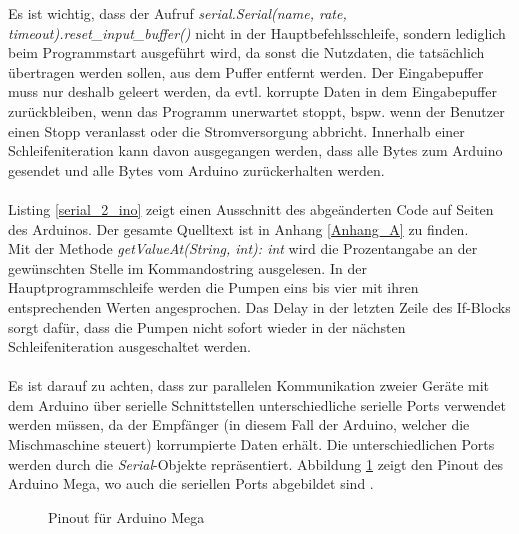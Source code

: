 Es ist wichtig, dass der Aufruf \textit{serial.Serial(name, rate, timeout).reset\_input\_buffer()} nicht in der Hauptbefehlsschleife, sondern lediglich beim Programmstart ausgeführt wird, da sonst die Nutzdaten, die tatsächlich übertragen werden sollen, aus dem Puffer entfernt werden. Der Eingabepuffer muss nur deshalb geleert werden, da evtl. korrupte Daten in dem Eingabepuffer zurückbleiben, wenn das Programm unerwartet stoppt, bspw. wenn der Benutzer einen Stopp veranlasst oder die Stromversorgung abbricht. Innerhalb einer Schleifeniteration kann davon ausgegangen werden, dass alle Bytes zum Arduino gesendet und alle Bytes vom Arduino zurückerhalten werden.\\\\
Listing \ref{serial_2_ino} zeigt einen Ausschnitt des abgeänderten Code auf Seiten des Arduinos. Der gesamte Quelltext ist in Anhang \ref{Anhang_A} zu finden.\\

Mit der Methode \textit{getValueAt(String, int): int} wird die Prozentangabe an der gewünschten Stelle im Kommandostring ausgelesen. In der Hauptprogrammschleife werden die Pumpen eins bis vier mit ihren entsprechenden Werten angesprochen. Das Delay in der letzten Zeile des If-Blocks sorgt dafür, dass die Pumpen nicht sofort wieder in der nächsten Schleifeniteration ausgeschaltet werden.\\\\
Es ist darauf zu achten, dass zur parallelen Kommunikation zweier Geräte mit dem Arduino über serielle Schnittstellen unterschiedliche serielle Ports verwendet werden müssen, da der Empfänger (in diesem Fall der Arduino, welcher die Mischmaschine steuert) korrumpierte Daten erhält. Die unterschiedlichen Ports werden durch die \textit{Serial}-Objekte repräsentiert. Abbildung \ref{fig:pinout_mega} zeigt den Pinout des Arduino Mega, wo auch die seriellen Ports abgebildet sind \cite{arduino_mega}.
\begin{figure}[H]
    \centering
    \caption{Pinout für Arduino Mega}
    \label{fig:pinout_mega}
\end{figure}
